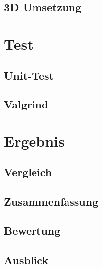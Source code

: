 \documentclass[a4paper]{scrartcl}
\begin{document}
\subsection{3D Umsetzung}\label{ch:3DUmsetzung}

\section{Test}\label{ch:Test}
\subsection{Unit-Test}\label{ch:Unit}
\subsection{Valgrind}\label{ch:Valgrind}

\section{Ergebnis}\label{ch:Ergebnis}

\subsection{Vergleich}\label{ch:Vergleich}
\subsection{Zusammenfassung}\label{ch:Zusammenfassung}
\subsection{Bewertung}\label{ch:Bewertung}
\subsection{Ausblick}\label{ch:Ausblick}

\newpage

%
%
\label{sec:Abkürzungsverzeichnis}
\end{document}
